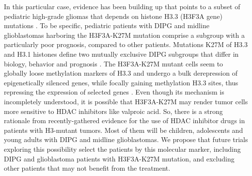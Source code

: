 In this particular case, evidence has been building up that points to a subset of pediatric high-grade gliomas that depends on histone H3.3 (H3F3A gene) mutations \cite{Wu_2012,Bender_2013,Solomon_2015}. To be specific, pediatric patients with DIPG and midline glioblastomas harboring the H3F3A-K27M mutation comprise a subgroup with a particularly poor prognosis, compared to other patients. Mutations K27M of H3.3 and H3.1 histones define two mutually exclusive DIPG subgroups that differ in biology, behavior and prognosis \cite{Castel_2015}. The H3F3A-K27M mutant cells seem to globally loose methylation markers of H3.3 and undergo a bulk derepression of epigenetically silenced genes, while focally gaining methylation H3.3 sites, thus repressing the expression of selected genes \cite{Chan_2013}. Even though its mechanism is incompletely understood, it is possible that H3F3A-K27M may render tumor cells more sensitive to HDAC inhibitors like valproic acid. 
So, there is a strong rationale from recently-gathered evidence for the use of HDAC inhibitor drugs in patients with H3-mutant tumors. Most of them will be children, adolescents and young adults with DIPG and midline glioblastomas. We propose that future trials exploring this possibility select the patients by this molecular marker, including DIPG and glioblastoma patients with H3F3A-K27M mutation, and excluding other patients that may not benefit from the treatment.